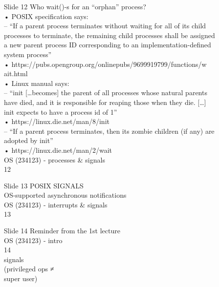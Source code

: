 \documentclass{beamer}
\begin{document}
\begin{frame}{Slide 12}
Who wait()-s for an “orphan” process?\\• POSIX specification says:\\– “If a parent process terminates without waiting for all of its child \\processes to terminate, the remaining child processes shall be assigned \\a new parent process ID corresponding to an implementation-defined \\system process”\\• https://pubs.opengroup.org/onlinepubs/9699919799/functions/w\\ait.html\\• Linux manual says:\\– “init […becomes] the parent of all processes whose natural parents \\have died, and it is responsible for reaping those when they die. […] \\init expects to have a process id of 1”\\• https://linux.die.net/man/8/init\\– “If a parent process terminates, then its zombie children (if any) are \\adopted by init”\\• https://linux.die.net/man/2/wait\\OS (234123) - processes \& signals\\12
\end{frame}
\begin{frame}{Slide 13}
POSIX SIGNALS\\OS-supported asynchronous notifications\\OS (234123) - interrupts \& signals\\13
\end{frame}
\begin{frame}{Slide 14}
Reminder from the 1st lecture\\OS (234123) - intro\\14\\signals\\(privileged ops ≠\\super user)
\end{frame}
\end{document}
